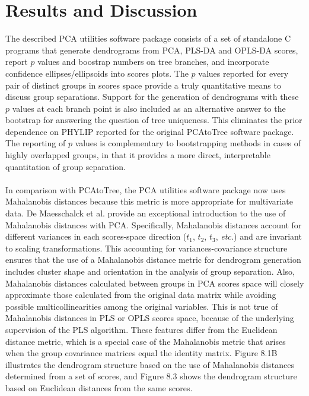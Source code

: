 \section{Results and Discussion}

\begin{doublespace}
The described PCA utilities software package consists of a set of standalone
C programs that generate dendrograms from PCA, PLS-DA and OPLS-DA scores,
report $p$ values and boostrap numbers on tree branches, and incorporate
confidence ellipses/ellipsoids into scores plots. The $p$ values reported for
every pair of distinct groups in scores space provide a truly quantitative
means to discuss group separations. Support for the generation of dendrograms
with these $p$ values at each branch point is also included as an alternative
answer to the bootstrap for answering the question of tree uniqueness. This
eliminates the prior dependence on PHYLIP \cite{retief:mmbio2000}
reported for the original PCAtoTree \cite{werth:abio2010} software
package. The reporting of $p$ values is complementary to bootstrapping methods
in cases of highly overlapped groups, in that it provides a more direct,
interpretable quantitation of group separation.
\\\\
In comparison with PCAtoTree, the PCA utilities software package now uses
Mahalanobis distances because this metric is more appropriate for multivariate
data. De Maesschalck et al. \cite{demaesschalck:cils2000} provide an
exceptional introduction to the use of Mahalanobis distances with PCA.
Specifically, Mahalanobis distances account for different variances in each
scores-space direction ($t_1$, $t_2$, $t_3$, \emph{etc.}) and are invariant
to scaling transformations. This accounting for variances-covariance structure
ensures that the use of a Mahalanobis distance metric for dendrogram generation
includes cluster shape and orientation in the analysis of group separation.
Also, Mahalanobis distances calculated between groups in PCA scores space will
closely approximate those calculated from the original data matrix while
avoiding possible multicollinearities among the original variables. This is
not true of Mahalanobis distances in PLS or OPLS scores space, because of the
underlying supervision of the PLS algorithm. These features differ from the
Euclidean distance metric, which is a special case of the Mahalanobis metric
that arises when the group covariance matrices equal the identity matrix.
Figure 8.1B illustrates the dendrogram structure based on the use of
Mahalanobis distances determined from a set of scores, and Figure 8.3 shows the
dendrogram structure based on Euclidean distances from the same scores.
\end{doublespace}

